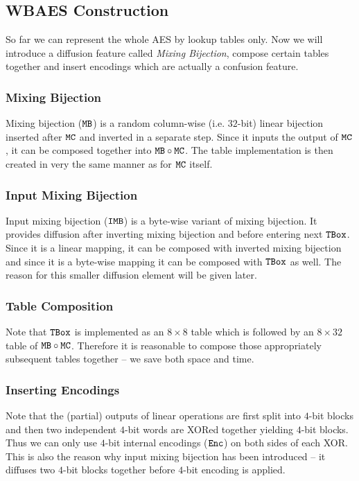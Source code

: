 \subsection{WBAES Construction}

So far we can represent the whole AES by lookup tables only. Now we will introduce a diffusion feature called {\em Mixing Bijection}, compose certain tables together and insert encodings which are actually a confusion feature.

\subsubsection{Mixing Bijection}
	
	Mixing bijection ($\texttt{MB}$) is a random column-wise (i.e. $32$-bit) linear bijection inserted after $\texttt{MC}$ and inverted in a separate step. Since it inputs the output of $\texttt{MC}$, it can be composed together into $\texttt{MB}\circ\texttt{MC}$. The table implementation is then created in very the same manner as for $\texttt{MC}$ itself.
	

\subsubsection{Input Mixing Bijection}
	
	Input mixing bijection ($\texttt{IMB}$) is a byte-wise variant of mixing bijection. It provides diffusion after inverting mixing bijection and before entering next $\texttt{TBox}$. Since it is a linear mapping, it can be composed with inverted mixing bijection and since it is a byte-wise mapping it can be composed with $\texttt{TBox}$ as well. The reason for this smaller diffusion element will be given later.

\subsubsection{Table Composition}
	
	Note that $\texttt{TBox}$ is implemented as an $8\times 8$ table which is followed by an $8\times 32$ table of $\texttt{MB}\circ\texttt{MC}$. Therefore it is reasonable to compose those appropriately subsequent tables together -- we save both space and time.

\subsubsection{Inserting Encodings}
	
	Note that the (partial) outputs of linear operations are first split into $4$-bit blocks and then two independent $4$-bit words are XORed together yielding $4$-bit blocks. Thus we can only use $4$-bit internal encodings ($\texttt{Enc}$) on both sides of each XOR. This is also the reason why input mixing bijection has been introduced -- it diffuses two $4$-bit blocks together before $4$-bit encoding is applied.
	
